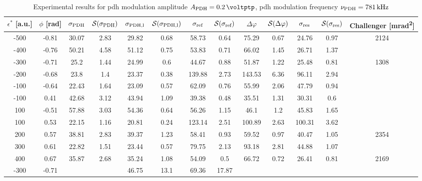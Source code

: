 \begin{landscape}
	\begin{table}
	\centering
	\begin{tabular}{|c|c|c|c|c|c|c|c|c|c|c|c|c|}
		\hline
		$\epsilon^*$ [a.u.] & $\phi$ [\si{\radian}] & $\sigma_{\text{PDH}}$ & $\mathcal{S}(\sigma_{\text{PDH}})$ & $\sigma_{\text{PDH,l}}$ & $\mathcal{S}(\sigma_{\text{PDH,l}})$  & $\sigma_{\text{ref}}$ & $\mathcal{S}(\sigma_{\text{ref}})$ & $\Delta \varphi$ & $\mathcal{S}(\Delta \varphi)$ & $\sigma_{\text{res}}$  & $\mathcal{S}(\sigma_{\text{res}})$ & Challenger [\si{\milli\radian\squared}] \\
		\hline
		\hline
		-500 & -0.81 & 30.07 & 2.83 & 29.82 & 0.68 & 58.73 & 0.64 & 75.29 & 0.67 & 24.76 & 0.97 & 2124\\
		-400 & -0.76 & 50.21 & 4.58 & 51.12 & 0.75 & 53.83 & 0.71 & 66.02 & 1.45 & 26.71 & 1.37 & \\
		-300 & -0.71 & 25.2 & 1.44 & 24.99 & 0.6 & 44.67 & 0.88 & 51.87 & 1.22 & 25.48 & 0.81 & 1308\\
		-200 & -0.68 & 23.8 & 1.4 & 23.37 & 0.38 & 139.88 & 2.73 & 143.53 & 6.36 & 96.11 & 2.94 & \\
		-100 & -0.64 & 22.43 & 1.64 & 23.09 & 0.57 & 62.09 & 0.76 & 55.99 & 2.06 & 47.79 & 0.94 & \\
		-100 & 0.41 & 42.68 & 3.12 & 43.94 & 1.09 & 39.38 & 0.48 & 35.51 & 1.31 & 30.31 & 0.6 & \\
		100 & -0.51 & 57.88 & 3.03 & 54.36 & 0.64 & 56.26 & 1.15 & 46.1 & 1.2 & 45.83 & 1.65 & \\
		100 & 0.53 & 22.15 & 1.16 & 20.81 & 0.24 & 123.14 & 2.51 & 100.89 & 2.63 & 100.31 & 3.62 & \\
		200 & 0.57 & 38.81 & 2.83 & 39.37 & 1.23 & 58.41 & 0.93 & 59.52 & 0.97 & 40.47 & 1.05 & 2354\\
		300 & 0.61 & 22.82 & 1.51 & 23.44 & 0.57 & 79.75 & 2.13 & 93.18 & 2.81 & 44.88 & 1.07 & \\
		400 & 0.67 & 35.87 & 2.68 & 35.24 & 1.08 & 54.09 & 0.5 & 66.72 & 0.72 & 26.41 & 0.81 & 2169\\
		\hline
		\hline
		-300 & -0.71 & & & 46.75 & 13.1 & 69.36 & 17.87 & & & & & \\
		\hline
	\end{tabular}
	\caption{Experimental results for \gls{pdh} modulation amplitude $\tind{A}{PDH} = \SI{0.2}{\voltptp}$, \gls{pdh} modulation frequency $\nu_{\text{PDH}} = \SI{781}{\kilo\hertz}$}
	\end{table}
	
	

\end{landscape}
